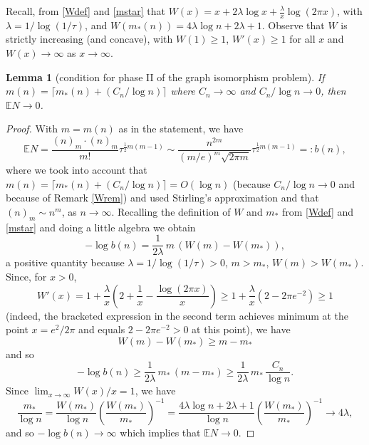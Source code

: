 \documentclass[reqno]{amsart}
\theoremstyle{theorem}
\newtheorem{lemma}[theorem]{Lemma}
\theoremstyle{definition}
\theoremstyle{remark}
\def\E{\mathbb{E}}
\newcommand{\1}{{\text{\Large $\mathfrak 1$}}}	%
\numberwithin{equation}{section}
\def\mylog{\operatorname{\textsc{log}}}
\begin{document}
Recall, from \eqref{Wdef} and \eqref{mstar} that
$W(x)= x+ 2\lambda \log x + \frac{\lambda}{x} \log(2\pi x)$, with $\lambda
= 1/\log(1/\tau)$, and
$W(m_*(n)) = 4 \lambda \log n + 2 \lambda+1$.
Observe that $W$ is strictly increasing (and concave),
with $W(1) \ge 1$, $W'(x) \ge 1$ for all $x$ and $W(x) \to \infty$
as $x \to \infty$.

\begin{lemma}[condition for phase II of the graph isomorphism problem]
\label{ENasymptlem}
If $m(n)= \lceil m_*(n)+(C_n/\log n)\rceil$ where $C_n \to \infty$ 
and $C_n/\log n \to 0$,
then $\E N \to 0$.
\end{lemma}
\begin{proof}
With $m=m(n)$ as in the statement, we have
\begin{equation}
\label{ENasympt}
\E N  = \frac{(n)_m \cdot (n)_m}{m!} \tau^{\frac12 m(m-1)}
\sim \frac{n^{2m}}{(m/e)^m \sqrt{2\pi m}} \tau^{\frac12 m(m-1)} =:b(n),
\end{equation}
where we took into account that $m(n) = \lceil m_*(n)+(C_n/\log n)\rceil
= O(\log n)$ (because $C_n/\log n \to 0$ and because of Remark \ref{Wrem}) and
used Stirling's approximation and that $(n)_m \sim n^m$, as $n \to \infty$.
Recalling the definition of $W$ and $m_*$ from \eqref{Wdef} and \eqref{mstar}
and doing a little algebra we obtain
\begin{equation}
\label{weealg}
- \log b(n) = \frac{1}{2\lambda} \, m\, ( W(m) - W(m_*) ),
\end{equation}
a positive quantity because $\lambda=1/\log(1/\tau)>0$, $m> m_*$,
$W(m) > W(m_*)$.
Since, for $x>0$, 
\begin{equation}
\label{Wprime}
W'(x) = 1+\frac{\lambda}{x}\left(2+\frac1x - \frac{\log(2\pi x)}{x}\right)
\ge 1+ \frac{\lambda}{x} (2-2\pi e^{-2}) \ge 1
\end{equation}
(indeed, the bracketed expression in the second term 
achieves minimum at the point $x=e^2/2\pi$ and
equals $2-2\pi{e^{-2}} > 0$ at this point),
we have 
\[
W(m)-W(m_*) \ge m-m_*
\]
and so
\[
-\log b(n) \ge  \frac{1}{2\lambda} \, m_*\, (m -m_*)
\ge \frac{1}{2\lambda} \, m_*\, \frac{C_n}{\log n}.
\]
Since $\lim_{x \to \infty} W(x)/x=1$, we have 
\begin{equation}
\label{4lambda}
\frac{m_*}{\log n} 
= \frac{W(m_*)}{\log n} \left(\frac{W(m_*)}{m_*}\right)^{-1}
= \frac{4\lambda \log n+2\lambda+1}{\log n} \left(\frac{W(m_*)}{m_*}\right)^{-1}
\to 4\lambda,
\end{equation}
and so $-\log b(n) \to \infty$ which implies that $\E N \to 0$.
\end{proof}
\end{document}
